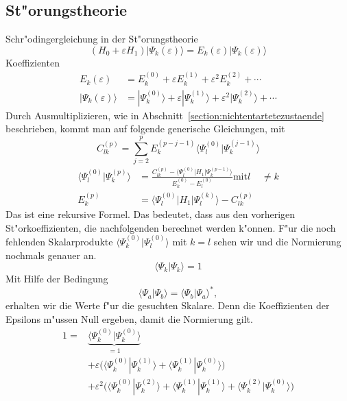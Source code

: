 \begin{refsection}
\section{St"orungstheorie}
Schr"odingergleichung in der St"orungstheorie
\begin{equation}
(H_0+\varepsilon H_1)|\Psi_k(\varepsilon)\rangle
=
E_k(\varepsilon)|\Psi_k(\varepsilon)\rangle
\end{equation}
Koeffizienten
\begin{align*}
E_k(\varepsilon)
&=
E_k^{(0)}+\varepsilon E_k^{(1)}+\varepsilon^2 E_k^{(2)}+\dotsb
\\
|\Psi_k(\varepsilon)\rangle
&=
|\Psi_k^{(0)}\rangle+\varepsilon|\Psi_k^{(1)}\rangle+
\varepsilon^2|\Psi_k^{(2)}\rangle+\dotsb
\end{align*}
Durch Ausmultiplizieren,
wie in Abschnitt~\ref{section:nichtentartetezustaende} beschrieben,
kommt man auf folgende generische Gleichungen, mit
\[
C_{lk}^{(p)}
=
\displaystyle\sum_{j=2}^{p} E_k^{(p-j-1)}
\langle\Psi_l^{(0)}|\Psi_k^{(j-1)}\rangle
\]
\begin{equation}
\begin{aligned}
\langle\Psi_l^{(0)}|\Psi_k^{(p)}\rangle
&=
\frac{C_{lk}^{(p)}-\langle\Psi_l^{(0)}|H_1|\Psi_k^{(p-1)}\rangle}
{E_k^{(0)}-E_l^{(0)}}
\text{mit}
l&\ne k
\\
E_k^{(p)}
&=
\langle\Psi_l^{(0)}|H_1|\Psi_l^{(k)}\rangle-C_{lk}^{(p)}
\end{aligned}
\end{equation}
Das ist eine rekursive Formel.
Das bedeutet, dass aus den vorherigen St"orkoeffizienten,
die nachfolgenden berechnet werden k"onnen.
F"ur die noch fehlenden Skalarprodukte $\langle\Psi_k^{(0)}|\Psi_l^{(0)}\rangle$
mit $k=l$ sehen wir und die Normierung nochmals genauer an.
\[
\langle\Psi_k|\Psi_k\rangle=1
\]
Mit Hilfe der Bedingung
\[
\langle\Psi_a|\Psi_b\rangle
=
\langle\Psi_b|\Psi_a\rangle^*,
\]
erhalten wir die Werte f"ur die gesuchten Skalare.
Denn die Koeffizienten der Epsilons m"ussen Null ergeben, damit die Normierung gilt.
\begin{align*}
1
=
&\underbrace{\langle\Psi_k^{(0)}|\Psi_k^{(0)}\rangle}_{=1}
\\
&+\varepsilon\bigl(\langle\Psi_k^{(0)}|\Psi_k^{(1)}\rangle
+\langle\Psi_k^{(1)}|\Psi_k^{(0)}\rangle\bigr)
\\
&+\varepsilon^2\bigl(\langle\Psi_k^{(0)}|\Psi_k^{(2)}\rangle
+\langle\Psi_k^{(1)}|\Psi_k^{(1)}\rangle
+\langle\Psi_k^{(2)}|\Psi_k^{(0)}\rangle\bigr)
\\

\end{align*}
\end{refsection}
